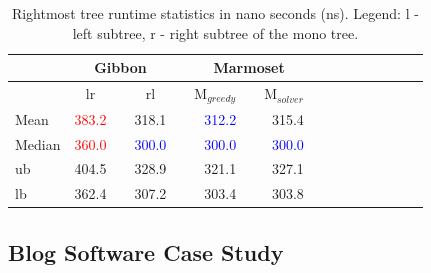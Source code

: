 \documentclass[acmsmall,review,anonymous]{acmart}\settopmatter{printfolios=true,printccs=false,printacmref=false}
\newcommand{\system}{{\sc Marmoset}\xspace}
\newcommand{\systemSolver}{{\sc M$_{\mathit{solver}}$}\xspace}
\newcommand{\systemGreedy}{{\sc M$_{\mathit{greedy}}$}\xspace}
\newcommand{\gibbon}{{\sc Gibbon}\xspace}
\newcommand{\ra}[1]{\renewcommand{\arraystretch}{#1}}
\begin{document}
\begin{table}[]
	\setlength{\tabcolsep}{2pt} \centering
	\ra{1}
	\caption{Rightmost tree runtime statistics in nano seconds (ns).
	Legend: l - left subtree, r - right subtree of the mono tree.}
	\begin{tabular}{@{}p{0.6in}rcrcrcrcrcrcrcr@{}}\toprule 
	 & \multicolumn{3}{|c|}{{\gibbon}} &
	 & \multicolumn{3}{c|}{{\system}}\\ \midrule
		
	 & \multicolumn{1}{c}{{lr}} & 
	 & \multicolumn{1}{c}{{rl}} &
	 & \multicolumn{1}{c}{\small{\systemGreedy}} & 
	 & \multicolumn{1}{c}{\small{\systemSolver}}\\ \midrule
	Mean   
	         &   \textcolor{red}{{383.2}}
			 &&   {318.1} 
			 &&   \textcolor{blue}{{312.2}}
			 &&   {315.4}

			\\
	Median
	        &  \textcolor{red}{{360.0}}
			&&   \textcolor{blue}{{300.0}}
			&&   \textcolor{blue}{{300.0}}
			&&   \textcolor{blue}{{300.0}}
			\\
	ub          
	        &    {404.5}
			&&   {328.9}
			&&   {321.1}
			&&   {327.1}
			\\
	lb           
	        &   {362.4}
			&&  {307.2}
			&&  {303.4}
			&&  {303.8}
			\\ 
	\bottomrule
	\end{tabular}
	\label{table:Right-Most-Tree}
\end{table}


















\subsection{Blog Software Case Study}
\label{subsect:blog}
\end{document}
